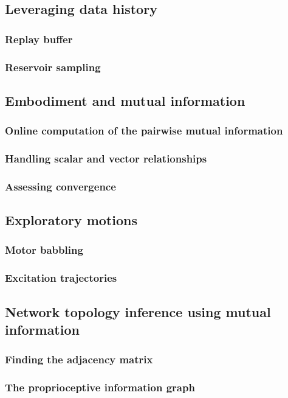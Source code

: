 \documentclass{article}
\begin{document}
\subsection{Leveraging data history}
\subsubsection{Replay buffer}
\subsubsection{Reservoir sampling}
\subsection{Embodiment and mutual information}
\subsubsection{Online computation of the pairwise mutual information}
\subsubsection{Handling scalar and vector relationships}
\subsubsection{Assessing convergence}
\subsection{Exploratory motions}
\subsubsection{Motor babbling}
\subsubsection{Excitation trajectories}
\subsection{Network topology inference using mutual information}
\subsubsection{Finding the adjacency matrix}
\subsubsection{The proprioceptive information graph}
\end{document}
